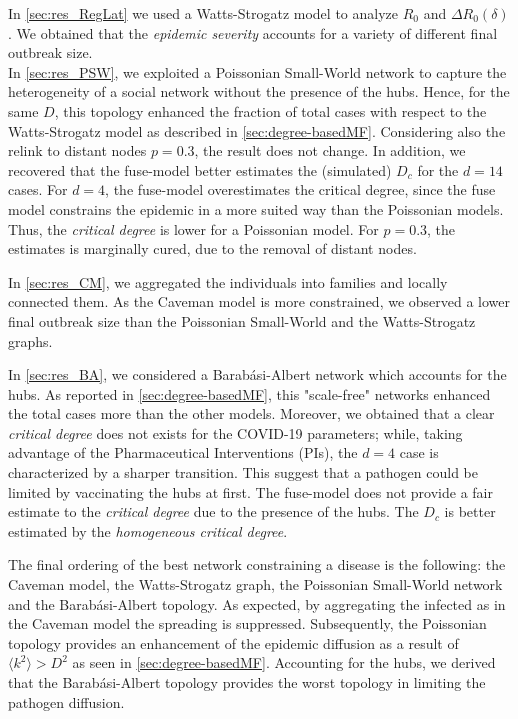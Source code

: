 \documentclass[a4paper,10pt,twoside]{book} %
\theoremstyle{definition}
\begin{document}
In \autoref{sec:res_RegLat} we used a Watts-Strogatz model to analyze $ R_0$ and $ \Delta R_0 (\delta)$. We obtained that the \textit{epidemic severity} accounts for a variety of different final outbreak size.\\
In \autoref{sec:res_PSW}, we exploited a Poissonian Small-World network to capture the heterogeneity of a social network without the presence of the hubs. Hence, for the same $ D$, this topology enhanced the fraction of total cases with respect to the Watts-Strogatz model as described in \autoref{sec:degree-basedMF}. 
Considering also the relink to distant nodes $ p = 0.3$, the result does not change.
In addition, we recovered that the fuse-model better estimates the (simulated) $ D_c$ for the $ d = 14$ cases. For $d=4$, the fuse-model overestimates the critical degree, since the fuse model constrains the epidemic in a more suited way than the Poissonian models. Thus, the \textit{critical degree} is lower for a Poissonian model. For $ p = 0.3$, the estimates is marginally cured, due to the removal of distant nodes. 

In \autoref{sec:res_CM}, we aggregated the individuals into families and locally connected them.
As the Caveman model is more constrained, we observed a lower final outbreak size than the Poissonian Small-World and the Watts-Strogatz graphs.

In \autoref{sec:res_BA}, we considered a Barabási-Albert network which accounts for the hubs. As reported in \autoref{sec:degree-basedMF}, this "scale-free" networks enhanced the total cases more than the other models. 
Moreover, we obtained that a clear \textit{critical degree} does not exists for the COVID-19 parameters; while, taking advantage of the Pharmaceutical Interventions (PIs), the $d = 4$ case is characterized by a sharper transition. This suggest that a pathogen could be limited by vaccinating the hubs at first.
The fuse-model does not provide a fair estimate to the \textit{critical degree} due to the presence of the hubs. The $ D_c$ is better estimated by the \textit{homogeneous critical degree}. 

The final ordering of the best network constraining a disease is the following: the Caveman model, the Watts-Strogatz graph, the Poissonian Small-World network and the Barabási-Albert topology. As expected, by aggregating the infected as in the Caveman model the spreading is suppressed. Subsequently, the Poissonian topology provides an enhancement of the epidemic diffusion as a result of $ \langle k^2 \rangle > D^{2}$ as seen in \autoref{sec:degree-basedMF}. Accounting for the hubs, we derived that the Barabási-Albert topology provides the worst topology in limiting the pathogen diffusion.
\end{document}

